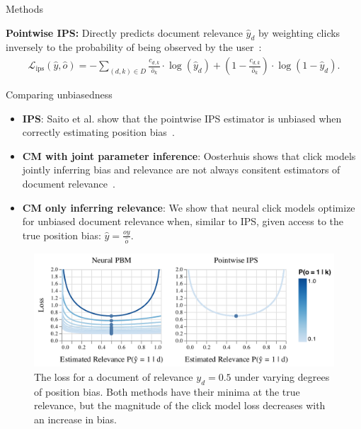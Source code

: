 \documentclass[final]{beamer}
\newlength{\onecolwid}
\begin{document}
\begin{frame}[t]
\begin{columns}[t]
\begin{column}{\onecolwid}
\begin{block}{Methods}
		\vspace{1ex}
		
		\textbf{Pointwise IPS:} Directly predicts document relevance $\hat{y}_d$ by weighting clicks inversely to the probability of being observed by the user~\cite{Saito2020PointwiseIPS}:
		\vspace{1ex}
		\begin{equation*}
			\begin{split}
			\mathcal{L}_{\text{ips}}(\hat{y}, \hat{o}) = - \sum_{(d,k) \in D} \frac{c_{d,k}}{\hat{o}_k} \cdot \log(\hat{y}_{d}) + (1 - \frac{c_{d,k}}{\hat{o}_k}) \cdot \log(1 - \hat{y}_{d}).
			\end{split}
		\end{equation*}

	\end{block}

	\vspace{2ex}
	
	\begin{alertblock}{Comparing unbiasedness}
		\vspace{1ex}

		\begin{itemize}
			\item \textbf{IPS}: Saito et al. show that the pointwise IPS estimator is unbiased when correctly estimating position bias~\cite{Saito2020PointwiseIPS}.
			\item \textbf{CM with joint parameter inference}: Oosterhuis shows that click models jointly inferring bias and relevance are not always consitent estimators of document relevance~\cite{Oosterhuis2022ULTRLimits}.
			\item \textbf{CM only inferring relevance}: \alert{We show that neural click models optimize for unbiased document relevance when, similar to IPS, given access to the true position bias}: $\hat{y} = \frac{o y}{\hat{o}}$.
		\end{itemize}

		\vspace{1ex}

		\begin{figure}[h]
			\includegraphics[width=1.\textwidth]{loss.pdf}
			\caption{The loss for a document of relevance $y_d = 0.5$ under varying degrees of position bias. Both methods have their minima at the true relevance, but the magnitude of the click model loss decreases with an increase in bias.}
		\end{figure}


\end{alertblock}
\end{column}
\end{columns}
\end{frame}
\end{document}
